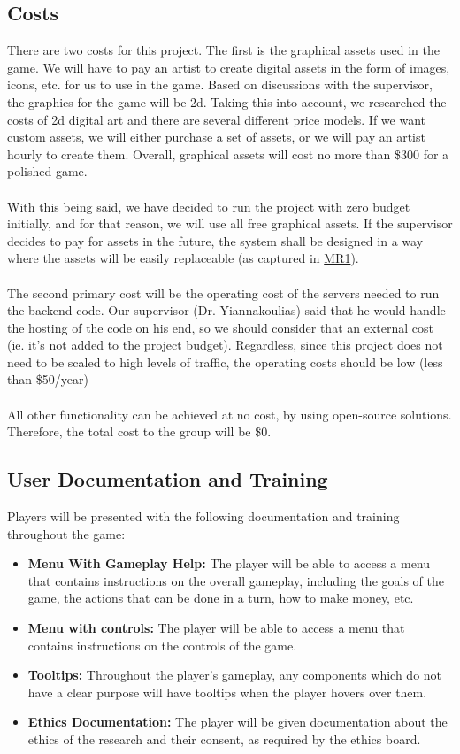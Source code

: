 \documentclass{article}
\begin{document}
\subsection{Costs}
There are two costs for this project. The first is the graphical assets used in the game. We will have to pay an artist to create digital assets in the form of images, icons, etc. for us to use in the game. Based on discussions with the supervisor, the graphics for the game will be 2d. Taking this into account, we researched the costs of 2d digital art and there are several different price models. If we want custom assets, we will either purchase a set of assets, or we will pay an artist hourly to create them. Overall, graphical assets will cost no more than \$300 for a polished game. 
\\ \\
With this being said, we have decided to run the project with zero budget initially, and for that reason, we will use all free graphical assets. If the supervisor decides to pay for assets in the future, the system shall be designed in a way where the assets will be easily replaceable (as captured in \hyperref[MR1]{MR1}).
\\ \\
The second primary cost will be the operating cost of the servers needed to run the backend code. Our supervisor (Dr. Yiannakoulias) said that he would handle the hosting of the code on his end, so we should consider that an external cost (ie. it's not added to the project budget). Regardless, since this project does not need to be scaled to high levels of traffic, the operating costs should be low (less than \$50/year)
\\ \\
All other functionality can be achieved at no cost, by using open-source solutions. Therefore, the total cost to the group will be \$0.

\subsection{User Documentation and Training}
Players will be presented with the following documentation and training throughout the game:
\begin{itemize}
    \item \textbf{Menu With Gameplay Help:} The player will be able to access a menu that contains instructions on the overall gameplay, including the goals of the game, the actions that can be done in a turn, how to make money, etc.
    
    \item \textbf{Menu with controls:} The player will be able to access a menu that contains instructions on the controls of the game.
    
    \item \textbf{Tooltips:} Throughout the player's gameplay, any components which do not have a clear purpose will have tooltips when the player hovers over them.
    
    \item \textbf{Ethics Documentation:} The player will be given documentation about the ethics of the research and their consent, as required by the ethics board.
\end{itemize}
\end{document}
